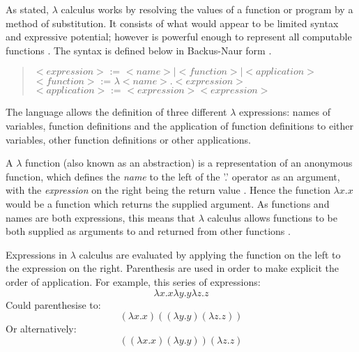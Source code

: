 \documentclass[12pt,a4paper]{article}
\begin{document}
As stated, $\lambda$ calculus works by resolving the values of a function or program by a method of substitution. It consists of what would appear to be limited syntax and expressive potential; however is powerful enough to represent all computable functions \cite{church1936}. The syntax is defined below in Backus-Naur form \cite{bnf}.

\begin{quote}
    {$<expression> \mbox{ := }  <name> | <function> | <application>$}
    {$<function> \mbox{ := } \lambda <name>.<expression>$}\newline
    {$<application> \mbox{ := } <expression><expression> $}\newline
\end{quote}

The language allows the definition of three different $\lambda$ expressions: names of variables, function definitions and the application of function definitions to either variables, other function definitions or other applications.

A $\lambda$ function (also known as an abstraction) is a representation of an anonymous function, which defines the \emph{name} to the left of the '.' operator as an argument, with the \emph{expression} on the right being the return value \cite{church1936}. Hence the function $\lambda x.x$ would be a function which returns the supplied argument. As functions and names are both expressions, this means that $\lambda$ calculus allows functions to be both supplied as arguments to and returned from other functions \cite{church1936}.

Expressions in $\lambda$ calculus are evaluated by applying the function on the left to the expression on the right. Parenthesis are used in order to make explicit the order of application. For example, this series of expressions:
\begin{displaymath}
    \lambda x.x \lambda y.y \lambda z.z
\end{displaymath}
Could parenthesise to:
\begin{displaymath}
    (\lambda x.x) ((\lambda y.y) (\lambda z.z))
\end{displaymath}
Or alternatively:
\begin{displaymath}
    ((\lambda x.x) (\lambda y.y)) (\lambda z.z)
\end{displaymath}
\end{document}
